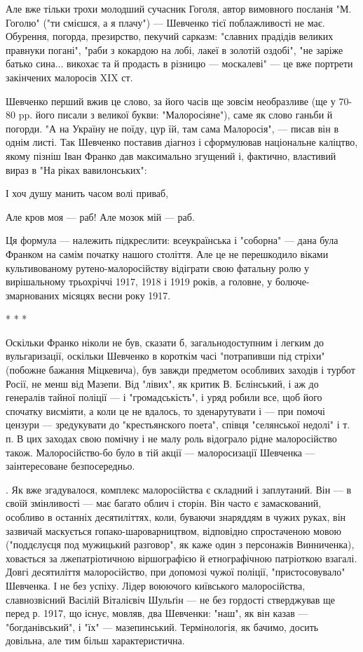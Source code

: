 Але вже тільки трохи молодший сучасник Гоголя, автор вимовного посланія "М. Гоголю" ("ти смієшся, а я плачу") — Шевченко тієї поблажливості не має. Обурення, погорда, презирство, пекучий сарказм: "славних прадідів великих правнуки погані", "раби з кокардою на лобі, лакеї в золотій оздобі", "не заріже батько сина... викохає та й продасть в різницю — москалеві" — це вже портрети закінчених малоросів XIX ст.

Шевченко перший вжив це слово, за його часів ще зовсім необразливе (ще у 70-80 pp. його писали з великої букви: "Малоросіяне"), саме як слово ганьби й погорди. "А на Україну не поїду, цур їй, там сама Малоросія", — писав він в однім листі. Так Шевченко поставив діагноз і сформулював національне каліцтво, якому пізніш Іван Франко дав максимально згущений і, фактично, властивий вираз в "На ріках вавилонських":

І хоч душу манить часом волі приваб,

Але кров моя — раб! Але мозок мій — раб.

Ця формула — належить підкреслити: всеукраїнська і "соборна" — дана була Франком на самім початку нашого століття. Але це не перешкодило віками культивованому рутено-малоросійству відіграти свою фатальну ролю у вирішальному трьохріччі 1917, 1918 і 1919 років, а головне, у болюче-змарнованих місяцях весни року 1917.

* * *

Оскільки Франко ніколи не був, сказати б, загальнодоступним і легким до вульгаризації, оскільки Шевченко в короткім часі "потрапивши під стріхи" (побожне бажання Міцкевича), був завжди предметом особливих заходів і турбот Росії, не менш від Мазепи. Від "лівих", як критик В. Бєлінський, і аж до генералів тайної поліції — і "громадськість", і уряд робили все, щоб його спочатку висміяти, а коли це не вдалось, то зденарутувати і — при помочі цензури — зредукувати до "крестьянского поета", співця "селянської недолі" і т. п. В цих заходах свою помічну і не малу роль відограло рідне малоросійство також. Малоросійство-бо було в тій акції — малоросизації Шевченка — заінтересоване безпосередньо.

. Як вже згадувалося, комплекс малоросійства є складний і заплутаний. Він — в своїй змінливості — має багато облич і сторін. Він часто є замаскований, особливо в останніх десятиліттях, коли, буваючи знаряддям в чужих руках, він зазвичай маскується гопако-шароварництвом, відповідно спростаченою мовою ("поддєлуєця под мужицький разговор", як каже один з персонажів Винниченка), ховається за лжепатріотичною віршографією й етнографічною патріоткою взагалі. Довгі десятиліття малоросійство, при допомозі чужої поліції, "пристосовувало" Шевченка. І не без успіху. Лідер воюючого київського малоросійства, славнозвісний Васілій Віталієвіч Шульґін — не без гордості стверджував ще перед р. 1917, що існує, мовляв, два Шевченки: "наш", як він казав — "богданівський", і "їх" — мазепинський. Термінологія, як бачимо, досить довільна, але тим більш характеристична.

